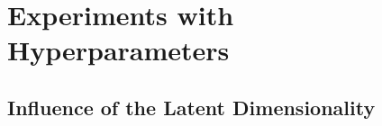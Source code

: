 \section{Experiments with Hyperparameters}


	\subsection{Influence of the Latent Dimensionality}
		\label{subsec:experimentLatentDim}

